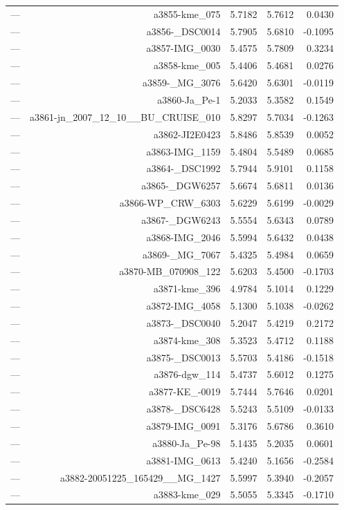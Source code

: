 \begin{table}[htbp]
\begin{tabular}{lrrrr}
— & a3855-kme_075 & 5.7182 & 5.7612 & 0.0430 \\
— & a3856-_DSC0014 & 5.7905 & 5.6810 & -0.1095 \\
— & a3857-IMG_0030 & 5.4575 & 5.7809 & 0.3234 \\
— & a3858-kme_005 & 5.4406 & 5.4681 & 0.0276 \\
— & a3859-_MG_3076 & 5.6420 & 5.6301 & -0.0119 \\
— & a3860-Ja_Pe-1 & 5.2033 & 5.3582 & 0.1549 \\
— & a3861-jn_2007_12_10__BU_CRUISE_010 & 5.8297 & 5.7034 & -0.1263 \\
— & a3862-JI2E0423 & 5.8486 & 5.8539 & 0.0052 \\
— & a3863-IMG_1159 & 5.4804 & 5.5489 & 0.0685 \\
— & a3864-_DSC1992 & 5.7944 & 5.9101 & 0.1158 \\
— & a3865-_DGW6257 & 5.6674 & 5.6811 & 0.0136 \\
— & a3866-WP_CRW_6303 & 5.6229 & 5.6199 & -0.0029 \\
— & a3867-_DGW6243 & 5.5554 & 5.6343 & 0.0789 \\
— & a3868-IMG_2046 & 5.5994 & 5.6432 & 0.0438 \\
— & a3869-_MG_7067 & 5.4325 & 5.4984 & 0.0659 \\
— & a3870-MB_070908_122 & 5.6203 & 5.4500 & -0.1703 \\
— & a3871-kme_396 & 4.9784 & 5.1014 & 0.1229 \\
— & a3872-IMG_4058 & 5.1300 & 5.1038 & -0.0262 \\
— & a3873-_DSC0040 & 5.2047 & 5.4219 & 0.2172 \\
— & a3874-kme_308 & 5.3523 & 5.4712 & 0.1188 \\
— & a3875-_DSC0013 & 5.5703 & 5.4186 & -0.1518 \\
— & a3876-dgw_114 & 5.4737 & 5.6012 & 0.1275 \\
— & a3877-KE_-0019 & 5.7444 & 5.7646 & 0.0201 \\
— & a3878-_DSC6428 & 5.5243 & 5.5109 & -0.0133 \\
— & a3879-IMG_0091 & 5.3176 & 5.6786 & 0.3610 \\
— & a3880-Ja_Pe-98 & 5.1435 & 5.2035 & 0.0601 \\
— & a3881-IMG_0613 & 5.4240 & 5.1656 & -0.2584 \\
— & a3882-20051225_165429__MG_1427 & 5.5997 & 5.3940 & -0.2057 \\
— & a3883-kme_029 & 5.5055 & 5.3345 & -0.1710 \\

\end{tabular}
\end{table}
